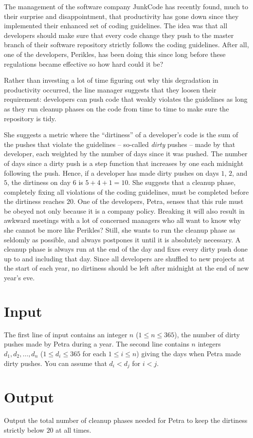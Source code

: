 %
\noindent
The management of the software company JunkCode has recently found,
much to their surprise and disappointment, that productivity has gone
down since they implemented their enhanced set of coding
guidelines. The idea was that all developers should make sure that
every code change they push to the master branch of their software
repository strictly follows the coding guidelines. After all, one of the developers,
Perikles, has been doing this since long before these regulations became effective so how hard could it be?

Rather than investing a lot of time figuring out why this degradation in
productivity occurred, the line manager suggests that
they loosen their requirement:
developers can push code that weakly violates the
guidelines as long as they run cleanup phases on the code from time to
time to make sure the repository is tidy.

She suggests a metric where the ``dirtiness'' of a developer's code is the
sum of the pushes that violate the guidelines -- so-called \emph{dirty} pushes -- made by that developer, each weighted by the number of  days since it was pushed. The number of days since a dirty push is a step function that increases by one each midnight following the push.
Hence, if a developer has made dirty pushes on days $1$, $2$, and $5$, the
dirtiness on day $6$ is $5+4+1=10$. She suggests that a cleanup phase,
completely fixing all violations of the coding guidelines,
must be completed before the dirtiness reaches $20$.
One of the developers, Petra, senses that this rule must be obeyed not only because it is a company policy. Breaking it will also result in awkward meetings with a lot of concerned managers who all want to know why she cannot be more like Perikles? Still, she wants to run the cleanup phase as seldomly as possible,
and always postpones it until it is absolutely necessary. A cleanup phase is always run at the end of the day and fixes every
dirty push done up to and including that day.
Since all developers are shuffled to new projects at the start
of each year, no dirtiness should be left after midnight at the end of new year's eve.

\section*{Input}
The first line of input contains an integer $n$ ($1 \leq n \leq 365$),
the number of dirty pushes made by Petra during a year. The second line
contains $n$ integers $d_1, d_2, \ldots, d_n$ ($1 \leq d_i \leq 365$
for each $1 \le i \le n$) giving the days when Petra
made dirty pushes. You can assume that $d_i < d_j$ for $i < j$.


\section*{Output}
Output the total number of cleanup phases needed for Petra to keep the dirtiness strictly below $20$ at
all times.
